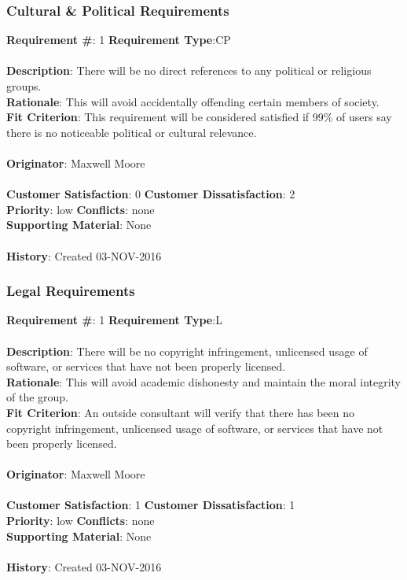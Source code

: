 \documentclass[titlepage]{article}
\begin{document}
\subsubsection{Cultural \& Political Requirements}
\begin{framed}
	\noindent\textbf{Requirement \#}: 1 \hfill \textbf{Requirement Type}:CP \hfill\\\\
	\noindent\textbf{Description}: There will be no direct references to any political or religious groups.\\
	\textbf{Rationale}: This will avoid accidentally offending certain members of society.\\
	\textbf{Fit Criterion}: This requirement will be considered satisfied if 99\% of users say there is no noticeable political or cultural relevance.\\\\
	\textbf{Originator}: Maxwell Moore\\\\
	\noindent\textbf{Customer Satisfaction}: 0 \hfill 	\textbf{Customer Dissatisfaction}: 2 \hfill\\
	\textbf{Priority}: low \hfill \textbf{Conflicts}: none \hfill\\
	\textbf{Supporting Material}: None\\\\
	\noindent\textbf{History}: Created 03-NOV-2016
\end{framed}

\subsubsection{Legal Requirements}
\begin{framed}
	\noindent\textbf{Requirement \#}: 1 \hfill \textbf{Requirement Type}:L\hfill\\\\
	\noindent\textbf{Description}: There will be no copyright infringement, unlicensed usage of software, or services that have not been properly licensed.\\
	\textbf{Rationale}: This will avoid academic dishonesty and maintain the moral integrity of the group.\\
	\textbf{Fit Criterion}: An outside consultant will verify that there has been no copyright infringement, unlicensed usage of software, or services that have not been properly licensed.\\\\
	\textbf{Originator}: Maxwell Moore\\\\
	\noindent\textbf{Customer Satisfaction}: 1 \hfill 	\textbf{Customer Dissatisfaction}: 1 \hfill\\
	\textbf{Priority}: low \hfill \textbf{Conflicts}: none \hfill\\
	\textbf{Supporting Material}: None\\\\
	\noindent\textbf{History}: Created 03-NOV-2016
\end{framed}
\end{document}
